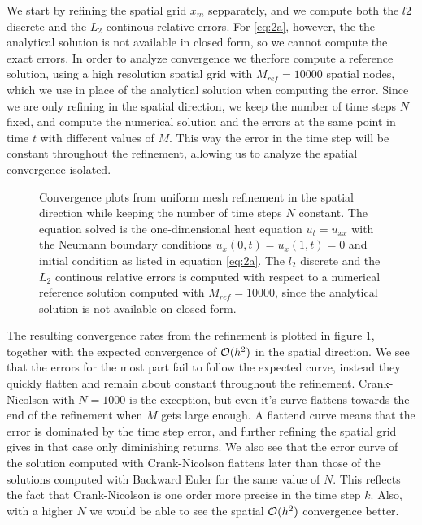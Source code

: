 We start by refining the spatial grid $x_m$ sepparately, 
and we compute both the $l2$ discrete and the $L_2$ continous relative errors. 
For \eqref{eq:2a}, however, the the analytical solution is not available in closed form, 
so we cannot compute the exact errors. 
In order to analyze convergence we therfore compute a reference solution, 
using a high resolution spatial grid with $M_{ref}=10000$ spatial nodes, 
which we use in place of the analytical solution when computing the error. 
Since we are only refining in the spatial direction, 
we keep the number of time steps $N$ fixed, 
and compute the numerical solution and the errors at the same point in time $t$ with different values of $M$. 
This way the error in the time step will be constant throughout the refinement, 
allowing us to analyze the spatial convergence isolated. 
\begin{figure}[ht]
    \centering
    
    \caption{
        Convergence plots from uniform mesh refinement 
        in the spatial direction while keeping the number of time steps $N$ constant. 
        The equation solved is the one-dimensional heat equation $u_t=u_{xx}$ 
        with the Neumann boundary conditions $u_x(0,t) = u_x(1,t)=0$ and initial condition 
        as listed in equation \eqref{eq:2a}. 
        The $l_2$ discrete and the $L_2$ continous relative errors is computed 
        with respect to a numerical reference solution computed with $M_{ref}=10000$, 
        since the analytical solution is not available on closed form. 
    }
    \label{fig:2a-convergence}
\end{figure}

The resulting convergence rates from the refinement is plotted in figure \ref{fig:2a-convergence}, 
together with the expected convergence of $\mathcal{O}(h^2)$ in the spatial direction. 
We see that the errors for the most part fail to follow the expected curve, 
instead they quickly flatten and remain about constant throughout the refinement. 
Crank-Nicolson with $N=1000$ is the exception, 
but even it's curve flattens towards the end of the refinement when $M$ gets large enough. 
A flattend curve means that the error is dominated by the time step error, 
and further refining the spatial grid gives in that case only diminishing returns. 
We also see that the error curve of the solution computed with Crank-Nicolson flattens later than those of the solutions computed with Backward Euler for the same value of $N$. 
This reflects the fact that Crank-Nicolson is one order more precise in the time step $k$. 
Also, 
with a higher $N$ we would be able to see the spatial $\mathcal{O}(h^2)$ convergence better. 

